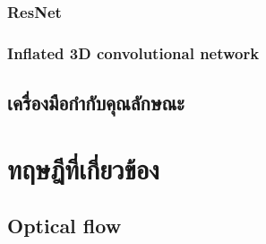 \subsubsection{ResNet}


\clearpage
\subsubsection{Inflated 3D convolutional network}

\clearpage

\subsection{เครื่องมือกำกับคุณลักษณะ}


\clearpage
%
%
%

\section{ทฤษฎีที่เกี่ยวข้อง}
\subsection{Optical flow}





